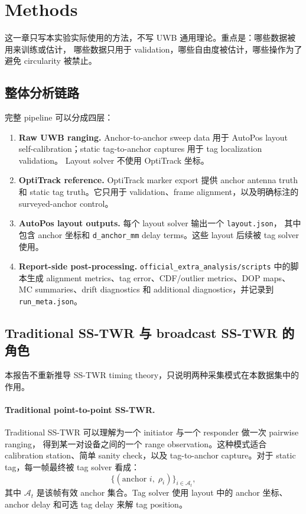 \documentclass[11pt,a4paper]{article}
\begin{document}
\section{Methods}
\label{sec:methods}

这一章只写本实验实际使用的方法，不写 UWB 通用理论。重点是：哪些数据被用来训练或估计，
哪些数据只用于 validation，哪些自由度被估计，哪些操作为了避免 circularity 被禁止。

\subsection{整体分析链路}
完整 pipeline 可以分成四层：
\begin{enumerate}[leftmargin=1.6em]
  \item \textbf{Raw UWB ranging.} Anchor-to-anchor sweep data 用于 AutoPos layout
        self-calibration；static tag-to-anchor captures 用于 tag localization validation。
        Layout solver 不使用 OptiTrack 坐标。
  \item \textbf{OptiTrack reference.} OptiTrack marker export 提供 anchor antenna truth
        和 static tag truth。它只用于 validation、frame alignment，以及明确标注的
        surveyed-anchor control。
  \item \textbf{AutoPos layout outputs.} 每个 layout solver 输出一个 \texttt{layout.json}，
        其中包含 anchor 坐标和 \texttt{d\_anchor\_mm} delay terms。这些 layout 后续被
        tag solver 使用。
  \item \textbf{Report-side post-processing.} \texttt{official\_extra\_analysis/scripts}
        中的脚本生成 alignment metrics、tag error、CDF/outlier metrics、DOP maps、MC
        summaries、drift diagnostics 和 additional diagnostics，并记录到 \texttt{run\_meta.json}。
\end{enumerate}

\subsection{Traditional SS-TWR 与 broadcast SS-TWR 的角色}
\label{sec:sstwrmethod}
本报告不重新推导 SS-TWR timing theory，只说明两种采集模式在本数据集中的作用。

\paragraph{Traditional point-to-point SS-TWR.}
Traditional SS-TWR 可以理解为一个 initiator 与一个 responder 做一次 pairwise ranging，
得到某一对设备之间的一个 range observation。这种模式适合 calibration station、简单
sanity check，以及 tag-to-anchor capture。对于 static tag，每一帧最终被 tag solver
看成：
\[
  \{(\text{anchor }i,\; \rho_i)\}_{i\in \mathcal{A}_t},
\]
其中 $\mathcal{A}_t$ 是该帧有效 anchor 集合。Tag solver 使用 layout 中的 anchor 坐标、
anchor delay 和可选 tag delay 来解 tag position。
\end{document}
